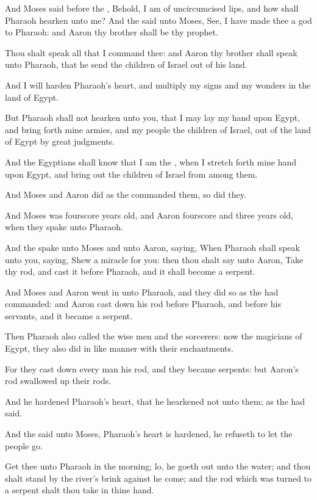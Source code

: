 \Verse And Moses said before the \LORD, Behold, I am of uncircumcised lips, and how shall Pharaoh hearken unto me?  \Chapter \Verse And the \LORD said unto Moses, See, I have made thee a god to Pharaoh: and Aaron thy brother shall be thy prophet.

\Verse Thou shalt speak all that I command thee: and Aaron thy brother shall speak unto Pharaoh, that he send the children of Israel out of his land.

\Verse And I will harden Pharaoh's heart, and multiply my signs and my wonders in the land of Egypt.

\Verse But Pharaoh shall not hearken unto you, that I may lay my hand upon Egypt, and bring forth mine armies, and my people the children of Israel, out of the land of Egypt by great judgments.

\Verse And the Egyptians shall know that I am the \LORD, when I stretch forth mine hand upon Egypt, and bring out the children of Israel from among them.

\Verse And Moses and Aaron did as the \LORD commanded them, so did they.

\Verse And Moses was fourscore years old, and Aaron fourscore and three years old, when they spake unto Pharaoh.

\Verse And the \LORD spake unto Moses and unto Aaron, saying, \Verse When Pharaoh shall speak unto you, saying, Shew a miracle for you: then thou shalt say unto Aaron, Take thy rod, and cast it before Pharaoh, and it shall become a serpent.

\Verse And Moses and Aaron went in unto Pharaoh, and they did so as the \LORD had commanded: and Aaron cast down his rod before Pharaoh, and before his servants, and it became a serpent.

\Verse Then Pharaoh also called the wise men and the sorcerers: now the magicians of Egypt, they also did in like manner with their enchantments.

\Verse For they cast down every man his rod, and they became serpents: but Aaron's rod swallowed up their rods.

\Verse And he hardened Pharaoh's heart, that he hearkened not unto them; as the \LORD had said.

\Verse And the \LORD said unto Moses, Pharaoh's heart is hardened, he refuseth to let the people go.

\Verse Get thee unto Pharaoh in the morning; lo, he goeth out unto the water; and thou shalt stand by the river's brink against he come; and the rod which was turned to a serpent shalt thou take in thine hand.

